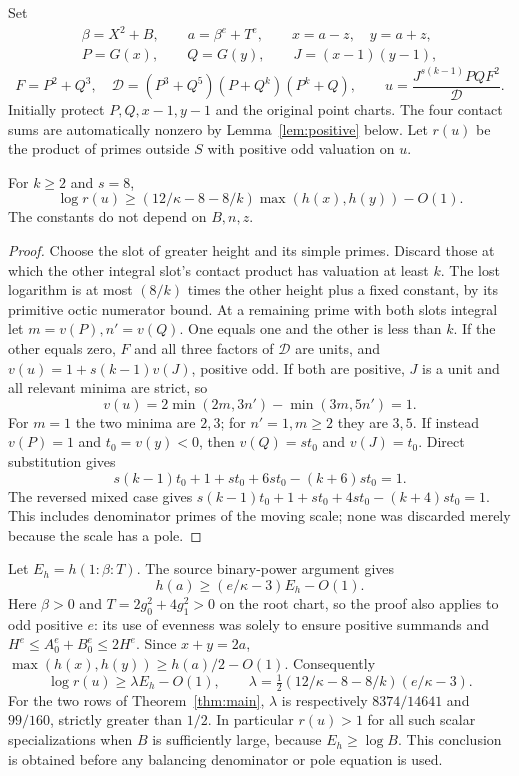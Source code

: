 \documentclass[11pt,a4paper]{article}
\begin{document}
Set
\[
 \begin{gathered}
 \beta=X^2+B,\qquad a=\beta^e+T^e,\qquad x=a-z,\quad y=a+z,\\
 P=G(x),\qquad Q=G(y),\qquad J=(x-1)(y-1),
 \end{gathered}
\]
\[
 F=P^2+Q^3,\quad
 \mathcal D=(P^3+Q^5)(P+Q^k)(P^k+Q),\qquad
 u=\frac{J^{s(k-1)}PQF^2}{\mathcal D}.
\]
Initially protect $P,Q,x-1,y-1$ and the original point charts. The four
contact sums are automatically nonzero by Lemma~\ref{lem:positive} below.
Let $r(u)$ be the product of primes outside $S$ with positive odd valuation
on $u$.

\begin{lemma}\label{lem:scalar}
For $k\ge2$ and $s=8$,
\[
 \log r(u)\ge\left(12/\kappa-8-8/k\right)
                  \max(h(x),h(y))-O(1).
\]
The constants do not depend on $B,n,z$.
\end{lemma}
\begin{proof}
Choose the slot of greater height and its simple primes. Discard those at
which the other integral slot's contact product has valuation at least
$k$. The lost logarithm is at most $(8/k)$ times the other height plus a
fixed constant, by its primitive octic numerator bound.
At a remaining prime with both slots integral let $m=v(P),n'=v(Q)$.
One equals one and the other is less than $k$. If the other equals zero,
$F$ and all three factors of $\mathcal D$ are units, and
$v(u)=1+s(k-1)v(J)$, positive odd. If both are positive, $J$ is a unit and
all relevant minima are strict, so
\[
 v(u)=2\min(2m,3n')-\min(3m,5n')=1.
\]
For $m=1$ the two minima are $2,3$; for $n'=1,m\ge2$ they are $3,5$.
If instead $v(P)=1$ and $t_0=v(y)<0$, then $v(Q)=s t_0$ and
$v(J)=t_0$. Direct substitution gives
\[
 s(k-1)t_0+1+s t_0+6s t_0-(k+6)s t_0=1.
\]
The reversed mixed case gives
$s(k-1)t_0+1+s t_0+4s t_0-(k+4)s t_0=1$.
This includes denominator primes of the moving scale; none was discarded
merely because the scale has a pole.
\end{proof}

Let $E_h=h(1:\beta:T)$. The source binary-power argument gives
\[
 h(a)\ge(e/\kappa-3)E_h-O(1).
\]
Here $\beta>0$ and $T=2g_0^2+4g_1^2>0$ on the root chart, so the proof
also applies to odd positive $e$: its use of evenness was solely to ensure
positive summands and $H^e\le A_0^e+B_0^e\le2H^e$.
Since $x+y=2a$, $\max(h(x),h(y))\ge h(a)/2-O(1)$. Consequently
\begin{equation}\label{eq:lambda}
 \log r(u)\ge\lambda E_h-O(1),\qquad
 \lambda=\tfrac12(12/\kappa-8-8/k)(e/\kappa-3).
\end{equation}
For the two rows of Theorem~\ref{thm:main}, $\lambda$ is respectively
$8374/14641$ and $99/160$, strictly greater than $1/2$.
In particular $r(u)>1$ for all such scalar specializations when $B$ is
sufficiently large, because $E_h\ge\log B$. This conclusion is obtained
before any balancing denominator or pole equation is used.
\end{document}
